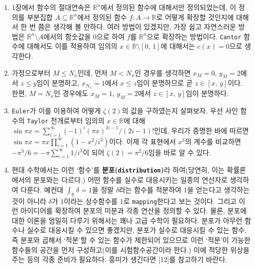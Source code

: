 \begin{enumerate}[label = \textsf{\textbf{\arabic*}}]
    \item 1장에서 함수의 절대연속은 $\mathbb{R}^n$에서 정의된 함수에 대해서만 정의되었는데, 이 정의를 부분집합 $A\subseteq\mathbb{R}^n$에서 정의된 함수 $f:A\to\mathbb{R}$로 어떻게 확장할 것인지에 대해서 한 번 쯤은 생각해 볼 만하다. 여러 방법이 있겠지만, 가장 쉽고 자연스러운 방법은 $\mathbb{R}^n\setminus A$에서의 함숫값을 $0$으로 하여 $f$를 $\mathbb{R}^n$으로 확장하는 방법이다. \texttt{Cantor} 함수에 대해서도 이를 적용하여 임의의 $x\in\mathbb{R}\setminus[0,\,1]$에 대해서는 $c(x)=0$으로 생각한다.
    \item 가정으로부터 $M\leq N_x$인데, 먼저 $M<N_x$인 경우를 생각하면 $x_M=0,\,y_M=2$에서 $z\leq y$임이 분명하고, $x_{N_x}=1$에서 $x\leq z$임이 분명하므로 곧 $z\in[x,\,y]$이다. 한편, $M=N_x$인 경우에도 $x_M=1,\,y_M=2$에서 $z\in[x,\,y]$임이 분명하다.
    \item \texttt{Euler}가 이를 이용하여 어떻게 $\zeta(2)$의 값을 구하였는지 살펴보자. 우선 사인 함수의 \texttt{Taylor} 전개로부터 임의의 $x\in\mathbb{R}$에 대해 $\sin\pi x=\sum_{i=1}^\infty(-1)^i(\pi x)^{2i-1}/(2i-1)!$인데, 우리가 증명한 바에 따르면 $\sin\pi x=\pi x\prod_{i=1}^\infty(1-x^2/i^2)$이다. 이제 각 표현에서 $x^3$의 계수를 비교하면 $-\pi^3/6=-\pi\sum_{i=1}^\infty1/i^2$이 되어 $\zeta(2)=\pi^2/6$임을 바로 알 수 있다.
    \item 현대 수학에서는 이런 `함수'를 \textbf{분포(\texttt{distribution})}라 하여(당연히, 이는 확률론에서의 분포와는 다르다.) 어떤 함수를 실수로 대응시키는 일종의 연산자로 생각하여 다룬다. 예컨대 $\int_{\mathbb{R}}\delta=1$을 정말 $\delta$라는 함수를 적분하여 $1$을 얻는다고 생각하는 것이 아니라 $\delta$가 $1$이라는 상수함수를 $1$로 \texttt{mapping}한다고 보는 것이다. 그리고 이런 아이디어를 확장하여 분포의 미분과 각종 연산을 정의할 수 있다. 물론, 분포에 대한 이론을 엄밀히 다루기 위해서는 꽤나 고급 수학이 필요하다. 분포가 아무런 함수나 실수로 대응시킬 수 있으면 좋겠지만, 분포가 실수로 대응시킬 수 있는 함수, 즉 분포와 곱해서 `적분'할 수 있는 함수가 제한되어 있으므로 이런 `적분'이 가능한 함수들의 공간을 먼저 구성하고(이를 시험함수공간이라 한다.) 이에 적당한 위상을 주는 등의 각종 준비가 필요하다. 흥미가 생긴다면 [12]를 참고하기 바란다.
\end{enumerate}

